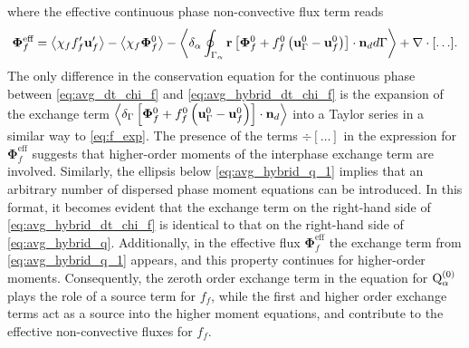 where the effective continuous phase non-convective flux term reads 
\begin{align}
    \mathbf{\Phi}_f^\text{eff}
    = \left<\chi_f f_f' \textbf{u}_f'\right>
    - \left<\chi_f \bm\Phi_f^0\right>
    - \left<\delta_\alpha \oint_{\Gamma_{\alpha}} \textbf{r}\left[
        \mathbf{\Phi}_f^0
        + f_f^0
        \left(
            \textbf{u}_\Gamma^0
            - \textbf{u}_f^0
        \right)
    \right]
    \cdot \textbf{n}_d d\Gamma\right>
    + \mathbf{\nabla}\cdot[\ldots].
\end{align}
The only difference in the conservation equation for the continuous phase between \eqref{eq:avg_dt_chi_f} and \eqref{eq:avg_hybrid_dt_chi_f} is the expansion of the exchange term $\left<\delta_\Gamma \left[
    \mathbf{\Phi}_f^0
    + f_f^0
    \left(
        \textbf{u}_\Gamma ^0
        - \textbf{u}_f^0
    \right)
\right]
\cdot \textbf{n}_d\right>$ into a Taylor series in a similar way to \ref{eq:f_exp}. 
The presence of the terms $\div[\ldots]$ in the expression for  $\mathbf{\Phi}_f^\text{eff}$ suggests that higher-order moments of the interphase exchange term are involved.
Similarly, the ellipsis below \ref{eq:avg_hybrid_q_1} implies that an arbitrary number of dispersed phase moment equations can be introduced. In this format, it becomes evident that the exchange term on the right-hand side of \ref{eq:avg_hybrid_dt_chi_f} is identical to that on the right-hand side of \ref{eq:avg_hybrid_q}. 
Additionally, in the effective flux $\mathbf{\Phi}_f^\text{eff}$ the exchange term from  \ref{eq:avg_hybrid_q_1} appears, and this property continues for higher-order moments.  
Consequently, the zeroth order exchange term in the equation for $\text Q_\alpha^{(0)}$ plays the role of a source term for $f_f$, while the first and higher order exchange terms act as a source into the higher moment equations, and contribute to the effective non-convective fluxes for $f_f$. 



